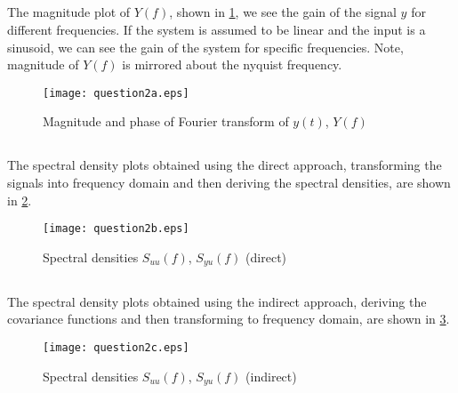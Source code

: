 \documentclass[times,12pt,reqno]{amsart}
\begin{document}
\subsection{}
The magnitude plot of $Y(f)$, shown in \ref{fig:q2a}, we see the gain of the
signal $y$ for different frequencies. If the system is assumed to be linear and
the input is a sinusoid, we can see the gain of the system for specific
frequencies. Note, magnitude of $Y(f)$ is mirrored about the nyquist frequency.

\begin{figure}[H]
    \begin{center}
        \texttt{[image: question2a.eps]}
    \end{center}
    \caption{Magnitude and phase of Fourier transform of $y(t)$, $Y(f)$}
    \label{fig:q2a}
\end{figure}

\subsection{}

The spectral density plots obtained using the direct approach, transforming the
signals into frequency domain and then deriving the spectral densities, are
shown in \ref{fig:q2b}.

\begin{figure}[H]
    \begin{center}
        \texttt{[image: question2b.eps]}
    \end{center}
    \caption{Spectral densities $S_{uu}(f)$, $S_{yu}(f)$ (direct)}
    \label{fig:q2b}
\end{figure}

\subsection{}

The spectral density plots obtained using the indirect approach, deriving the
covariance functions and then transforming to frequency domain, are shown in
\ref{fig:q2c}.

\begin{figure}[H]
    \begin{center}
        \texttt{[image: question2c.eps]}
    \end{center}
    \caption{Spectral densities $S_{uu}(f)$, $S_{yu}(f)$ (indirect)}
    \label{fig:q2c}
\end{figure}
\end{document}

